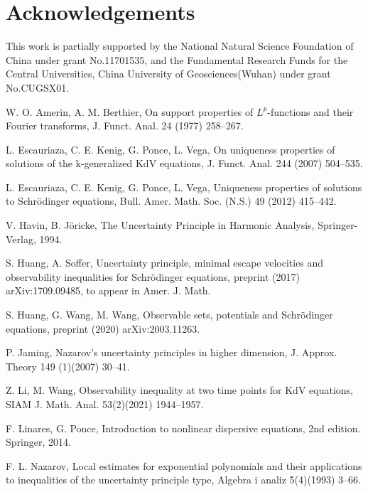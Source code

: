 \documentclass[12pt]{amsart}
\theoremstyle{definition}
\numberwithin{equation}{section}
\begin{document}
\section*{Acknowledgements}

This work is partially supported by the National Natural Science Foundation of China under grant No.11701535, and the Fundamental Research Funds for the Central Universities, China University of Geosciences(Wuhan) under grant No.CUGSX01.

\begin{thebibliography}{999}

{\scriptsize


 W. O. Amerin, A. M. Berthier, On support properties of $L^p$-functions and their Fourier transforms, J. Funct. Anal. 24 (1977) 258--267.


  L. Escauriaza, C. E. Kenig, G. Ponce, L. Vega, On uniqueness properties of solutions
of the k-generalized KdV equations, J. Funct. Anal.  244 (2007) 504--535.

  L. Escauriaza, C. E. Kenig, G. Ponce, L. Vega, Uniqueness properties of solutions to Schr\"{o}dinger equations,
Bull. Amer. Math. Soc. (N.S.) 49 (2012) 415--442.

 V. Havin, B. J\"{o}ricke,  The Uncertainty Principle in Harmonic Analysis, Springer-Verlag, 1994.


 S. Huang, A. Soffer, Uncertainty principle, minimal escape velocities and observability
inequalities for Schr\"{o}dinger equations,  preprint (2017) arXiv:1709.09485,   to appear in Amer. J. Math.

 S. Huang, G. Wang, M. Wang, Observable sets, potentials and Schr\"{o}dinger equations, preprint (2020) arXiv:2003.11263.

 P. Jaming, Nazarov's uncertainty principles in higher dimension, J. Approx. Theory 149 (1)(2007) 30--41.

 Z. Li, M. Wang, Observability inequality at two time points for KdV equations, SIAM J. Math. Anal. 53(2)(2021) 1944--1957.

 F. Linares, G. Ponce, Introduction to nonlinear dispersive equations, 2nd edition. Springer, 2014.


 F. L. Nazarov, Local estimates for exponential polynomials and their applications to inequalities of the
uncertainty principle type, Algebra i analiz 5(4)(1993) 3--66.

}
\end{thebibliography}
\end{document}
